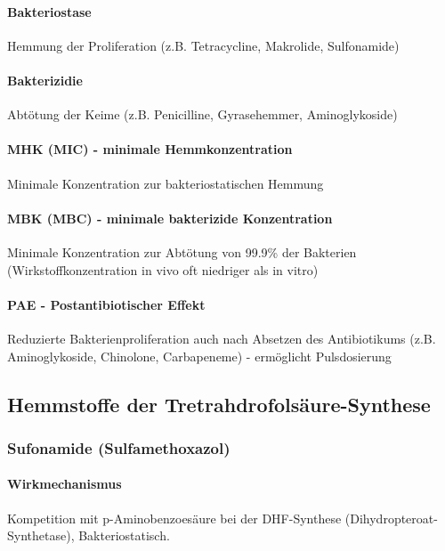 \documentclass[10pt,a4paper]{report}
\begin{document}
\paragraph{Bakteriostase} %
\label{par:bakteriostase}
Hemmung der Proliferation (z.B. Tetracycline, Makrolide, Sulfonamide)
\paragraph{Bakterizidie} %
\label{par:bakterizidie}
 Abtötung der Keime (z.B. Penicilline, Gyrasehemmer, Aminoglykoside)
\paragraph{MHK (MIC) - minimale Hemmkonzentration} %
\label{par:mhk_mic_minimale_hemmkonzentration}
Minimale Konzentration zur bakteriostatischen Hemmung
\paragraph{MBK (MBC) - minimale bakterizide Konzentration} %
\label{par:mbk_mbc_minimale_bakterizide_konzentration}
Minimale Konzentration zur Abtötung von 99.9\% der Bakterien (Wirkstoffkonzentration in vivo oft niedriger als in vitro)
\paragraph{PAE - Postantibiotischer Effekt} %
\label{par:pae_postantibiotischer_effekt}
Reduzierte Bakterienproliferation auch nach Absetzen des Antibiotikums (z.B. Aminoglykoside, Chinolone, Carbapeneme) - ermöglicht Pulsdosierung 
\subsection{Hemmstoffe der Tretrahdrofolsäure-Synthese} %
\label{sub:hemmstoffe_der_tretrahdrofols_ure_synthese}
\subsubsection{Sufonamide (Sulfamethoxazol)} %
\label{ssub:sufonamide_sulfamethoxazol_}
\paragraph{Wirkmechanismus} %
\label{par:wirkmechanismus}
Kompetition mit p-Aminobenzoesäure bei der DHF-Synthese (Dihydropteroat-Synthetase), Bakteriostatisch.
\end{document}
